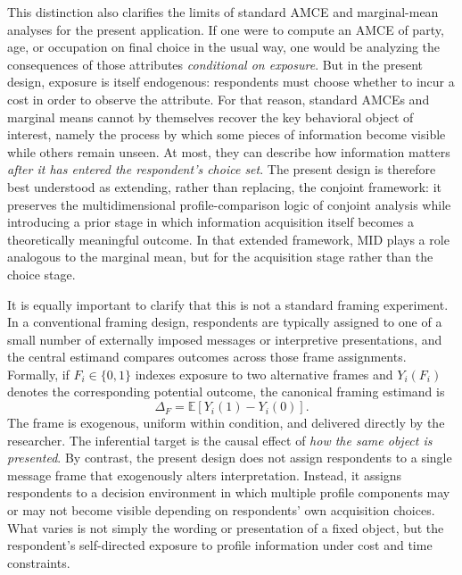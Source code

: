 \documentclass[11pt]{article}
\begin{document}
This distinction also clarifies the limits of standard AMCE and marginal-mean analyses for the present application. If one were to compute an AMCE of party, age, or occupation on final choice in the usual way, one would be analyzing the consequences of those attributes \emph{conditional on exposure}. But in the present design, exposure is itself endogenous: respondents must choose whether to incur a cost in order to observe the attribute. For that reason, standard AMCEs and marginal means cannot by themselves recover the key behavioral object of interest, namely the process by which some pieces of information become visible while others remain unseen. At most, they can describe how information matters \emph{after it has entered the respondent's choice set}. The present design is therefore best understood as extending, rather than replacing, the conjoint framework: it preserves the multidimensional profile-comparison logic of conjoint analysis while introducing a prior stage in which information acquisition itself becomes a theoretically meaningful outcome. In that extended framework, MID plays a role analogous to the marginal mean, but for the acquisition stage rather than the choice stage.

It is equally important to clarify that this is not a standard framing experiment. In a conventional framing design, respondents are typically assigned to one of a small number of externally imposed messages or interpretive presentations, and the central estimand compares outcomes across those frame assignments. Formally, if $F_i \in \{0,1\}$ indexes exposure to two alternative frames and $Y_i(F_i)$ denotes the corresponding potential outcome, the canonical framing estimand is
\[
\Delta_F = \mathbb{E}[Y_i(1)-Y_i(0)].
\]
The frame is exogenous, uniform within condition, and delivered directly by the researcher. The inferential target is the causal effect of \emph{how the same object is presented}. By contrast, the present design does not assign respondents to a single message frame that exogenously alters interpretation. Instead, it assigns respondents to a decision environment in which multiple profile components may or may not become visible depending on respondents' own acquisition choices. What varies is not simply the wording or presentation of a fixed object, but the respondent's self-directed exposure to profile information under cost and time constraints.
\end{document}
